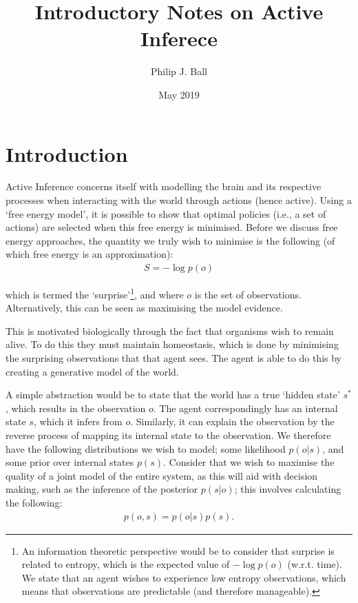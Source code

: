 \documentclass{article}
\title{Introductory Notes on Active Inferece}
\author{Philip J. Ball}
\date{May 2019}
\begin{document}
\maketitle

\section{Introduction}

Active Inference concerns itself with modelling the brain and its respective processes when interacting with the world through actions (hence active). Using a `free energy model', it is possible to show that optimal policies (i.e., a set of actions) are selected when this free energy is minimised. Before we discuss free energy approaches, the quantity we truly wish to minimise is the following (of which free energy is an approximation):
\begin{align}
    S = - \log p(o)
\end{align}

which is termed the `surprise'\footnote{An information theoretic perspective would be to consider that surprise is related to entropy, which is the expected value of $-\log p(o)$ (w.r.t. time). We state that an agent wishes to experience low entropy observations, which means that observations are predictable (and therefore manageable).}, and where $o$ is the set of observations. Alternatively, this can be seen as maximising the model evidence.

This is motivated biologically through the fact that organisms wish to remain alive. To do this they must maintain homeostasis, which is done by minimising the surprising observations that that agent sees. The agent is able to do this by creating a generative model of the world.

A simple abstraction would be to state that the world has a true `hidden state' $s^*$, which results in the observation $o$. The agent correspondingly has an internal state $s$, which it infers from $o$. Similarly, it can explain the observation by the reverse process of mapping its internal state to the observation. We therefore have the following distributions we wish to model; some likelihood $p(o|s)$, and some prior over internal states $p(s)$. Consider that we wish to maximise the quality of a joint model of the entire system, as this will aid with decision making, such as the inference of the posterior $p(s|o)$; this involves calculating the following:
\begin{align}
    p(o,s) = p(o|s)p(s).
\end{align}
\end{document}
